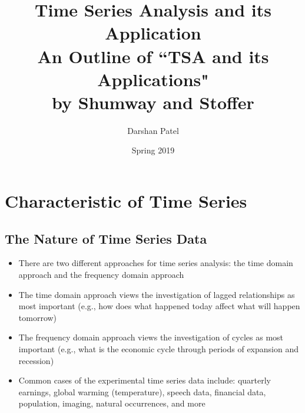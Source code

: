 \documentclass[12pt]{article}
\begin{document}
\theoremstyle{definition}
\newtheorem{theorem}{Theorem}[section]
\newtheorem{definition}{Definition}[section]
\newtheorem{example}{Example}[section]

\title{Time Series Analysis and its Application \\ \Large An Outline of ``TSA and its Applications" \\ by Shumway and Stoffer}
\author{Darshan Patel}
\date{Spring 2019}
\maketitle

\tableofcontents 

\newpage
\section{Characteristic of Time Series}
\subsection{The Nature of Time Series Data}
\begin{itemize}
\item There are two different approaches for time series analysis: the time domain approach and the frequency domain approach
\item The time domain approach views the investigation of lagged relationships as most important (e.g., how does what happened today affect what will happen tomorrow)
\item The frequency domain approach views the investigation of cycles as most important (e.g., what is the economic cycle through periods of expansion and recession)
\item Common cases of the experimental time series data include: quarterly earnings, global warming (temperature), speech data, financial data, population, imaging, natural occurrences, and more
\end{itemize}
\end{document}
